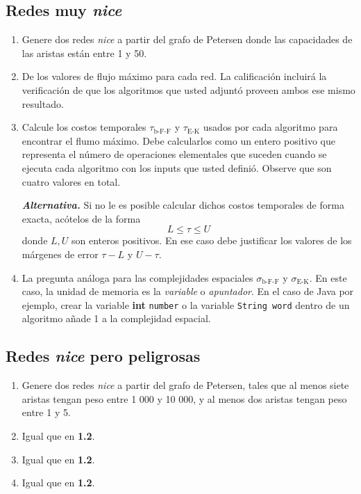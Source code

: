 \subsection{Redes muy \emph{nice}}
\begin{enumerate}
	\item Genere dos redes \emph{nice} a partir del grafo de Petersen
		donde las capacidades de las aristas están entre 1 y 50.
	\item De los valores de flujo máximo para cada red. La calificación incluirá
		la verificación de que los algoritmos que usted adjuntó proveen
		ambos ese mismo resultado.
	\item Calcule los costos temporales $\tau_\text{b-F-F}$ y $\tau_\text{E-K}$
		usados por
		cada algoritmo para encontrar el flumo máximo. Debe calcularlos como
		un entero positivo que representa el número de operaciones
		elementales que suceden cuando se ejecuta cada algoritmo con los
		inputs que usted definió. Observe que son cuatro valores en total.

		\textbf{\emph{Alternativa.}} Si no le es posible calcular dichos
		costos temporales de forma exacta, acótelos de la forma
		\[
			L \leq \tau \leq U
		\]
		donde $L, U$ son enteros positivos. En ese caso debe justificar los
		valores de los márgenes de error $\tau - L$ y $U - \tau$.
	\item La pregunta análoga para las complejidades espaciales
		$\sigma_\text{b-F-F}$ y $\sigma_\text{E-K}$. En este caso, la unidad
		de memoria es la \emph{variable} o \emph{apuntador}. En el caso de
		Java por ejemplo, crear la variable \textbf{int} \texttt{number} o
		la variable \texttt{String word} dentro de un algoritmo añade 1 a la
		complejidad espacial.
\end{enumerate}

\subsection{Redes \emph{nice} pero peligrosas}
\begin{enumerate}
	\item Genere dos redes \emph{nice} a partir del grafo de Petersen, tales que
		al menos siete aristas tengan peso entre 1 000 y 10 000, y al menos
		dos aristas tengan peso entre 1 y 5.
	\item Igual que en \textbf{1.2}.
	\item Igual que en \textbf{1.2}.
	\item Igual que en \textbf{1.2}.
\end{enumerate}

